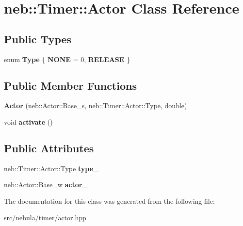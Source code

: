\hypertarget{classneb_1_1Timer_1_1Actor}{\section{neb\-:\-:\-Timer\-:\-:\-Actor \-Class \-Reference}
\label{classneb_1_1Timer_1_1Actor}
}
\subsection*{\-Public \-Types}
\begin{DoxyCompactItemize}
\item 
enum {\bfseries \-Type} \{ {\bfseries \-N\-O\-N\-E} =  0, 
{\bfseries \-R\-E\-L\-E\-A\-S\-E}
 \}
\end{DoxyCompactItemize}
\subsection*{\-Public \-Member \-Functions}
\begin{DoxyCompactItemize}
\item 
\hypertarget{classneb_1_1Timer_1_1Actor_ad187da5a4b8907ff074d331d85cf6aec}{{\bfseries \-Actor} (neb\-::\-Actor\-::\-Base\-\_\-s, neb\-::\-Timer\-::\-Actor\-::\-Type, double)}\label{classneb_1_1Timer_1_1Actor_ad187da5a4b8907ff074d331d85cf6aec}

\item 
\hypertarget{classneb_1_1Timer_1_1Actor_a8566283cef213c978a0d2b4a458b5a0a}{void {\bfseries activate} ()}\label{classneb_1_1Timer_1_1Actor_a8566283cef213c978a0d2b4a458b5a0a}

\end{DoxyCompactItemize}
\subsection*{\-Public \-Attributes}
\begin{DoxyCompactItemize}
\item 
\hypertarget{classneb_1_1Timer_1_1Actor_ab10e4bb47a25ad49687935b9fb0257de}{neb\-::\-Timer\-::\-Actor\-::\-Type {\bfseries type\-\_\-}}\label{classneb_1_1Timer_1_1Actor_ab10e4bb47a25ad49687935b9fb0257de}

\item 
\hypertarget{classneb_1_1Timer_1_1Actor_a359f5b4e9d2129521d65aeaed1c22cd3}{neb\-::\-Actor\-::\-Base\-\_\-w {\bfseries actor\-\_\-}}\label{classneb_1_1Timer_1_1Actor_a359f5b4e9d2129521d65aeaed1c22cd3}

\end{DoxyCompactItemize}


\-The documentation for this class was generated from the following file\-:\begin{DoxyCompactItemize}
\item 
src/nebula/timer/actor.\-hpp\end{DoxyCompactItemize}
